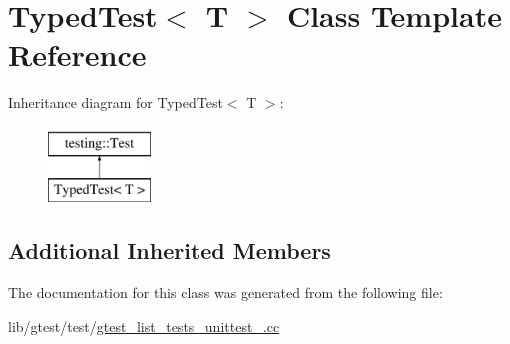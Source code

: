 \hypertarget{class_typed_test}{\section{Typed\-Test$<$ T $>$ Class Template Reference}
\label{class_typed_test}
}
Inheritance diagram for Typed\-Test$<$ T $>$\-:\begin{figure}[H]
\begin{center}
\leavevmode
\includegraphics[height=2.000000cm]{class_typed_test}
\end{center}
\end{figure}
\subsection*{Additional Inherited Members}


The documentation for this class was generated from the following file\-:\begin{DoxyCompactItemize}
\item 
lib/gtest/test/\hyperlink{gtest__list__tests__unittest___8cc}{gtest\-\_\-list\-\_\-tests\-\_\-unittest\-\_\-.\-cc}\end{DoxyCompactItemize}
